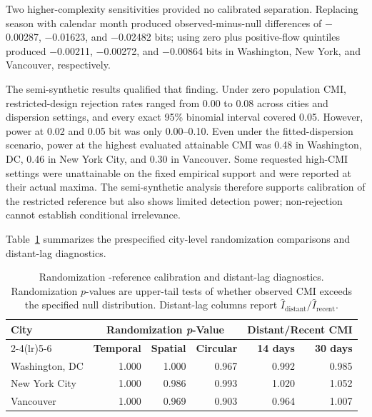 \documentclass[applsci,article,accept,moreauthors]{Definitions/mdpi}
\def\hl#1{#1}%
\begin{document}
{Two higher-complexity sensitivities provided no calibrated separation.
Replacing season with calendar month produced observed-minus-null differences
of $-$0.00287, $-$0.01623, and $-$0.02482 bits; using zero plus positive-flow
quintiles produced $-$0.00211, $-$0.00272, and $-$0.00864 bits in Washington, New
York, and Vancouver, respectively.}

The semi-synthetic results qualified that finding. Under zero population
CMI, restricted-design rejection rates ranged from 0.00 to 0.08 across
cities and dispersion settings, and every exact 95\% binomial interval
covered 0.05. However, power at 0.02 and 0.05 bit was only 0.00--0.10.
Even under the fitted-dispersion scenario, power at the highest evaluated
attainable CMI was 0.48 in Washington, DC, 0.46 in New York City, and
0.30 in Vancouver. Some requested high-CMI settings were unattainable on
the fixed empirical support and were reported at their actual maxima.
The semi-synthetic analysis therefore supports calibration of the restricted
reference but also shows limited detection power; non-rejection cannot establish
conditional irrelevance.

\hl{Table}~\ref{tab:null_calibration} \hl{summarizes the prespecified city-level randomization comparisons and distant-lag diagnostics.}




\begin{table}[H]
\caption{{\hl{Randomization}%
-reference calibration and distant-lag diagnostics.} Randomization
\(p\)-values are upper-tail tests of whether observed CMI exceeds the
specified null distribution. Distant-lag columns report
\(\widehat I_{\mathrm{distant}}/\widehat I_{\mathrm{recent}}\).}
\label{tab:null_calibration}
\centering
\begin{tabular*}{\linewidth}{@{\extracolsep{\fill}}lrrrrr@{}}
\toprule
\textbf{City} & \multicolumn{3}{c}{\textbf{Randomization \textit{p}-Value}} &
\multicolumn{2}{c}{\textbf{Distant/Recent CMI}}\\
\cmidrule(lr){2-4}\cmidrule(lr){5-6}
 & \textbf{Temporal} & \textbf{Spatial} & \textbf{Circular} &
\textbf{14 days} & \textbf{30 days}\\
\midrule
Washington, DC & 1.000 & 1.000 & 0.967 & 0.992 & 0.985\\
New York City & 1.000 & 0.986 & 0.993 & 1.020 & 1.052\\
Vancouver & 1.000 & 0.969 & 0.903 & 0.964 & 1.007\\
\bottomrule
\end{tabular*}
\end{table}
\unskip
\end{document}
